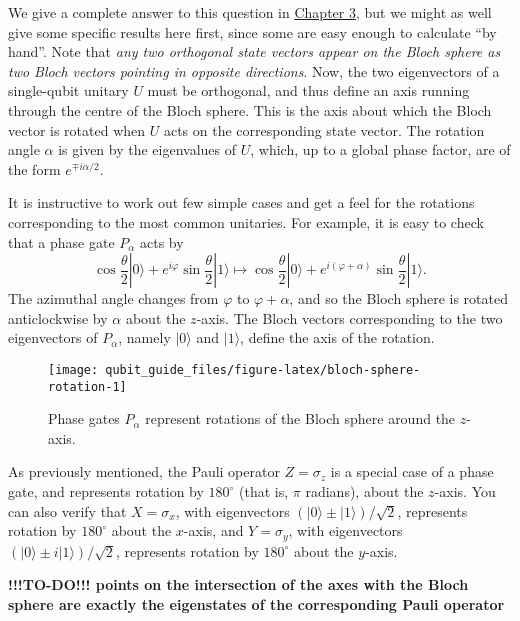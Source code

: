 \documentclass[fleqn]{article}
\begin{document}
We give a complete answer to this question in \protect\hyperlink{quantum-gates}{Chapter 3}, but we might as well give some specific results here first, since some are easy enough to calculate ``by hand''.
Note that \emph{any two orthogonal state vectors appear on the Bloch sphere as two Bloch vectors pointing in opposite directions}.
Now, the two eigenvectors of a single-qubit unitary \(U\) must be orthogonal, and thus define an axis running through the centre of the Bloch sphere.
This is the axis about which the Bloch vector is rotated when \(U\) acts on the corresponding state vector.
The rotation angle \(\alpha\) is given by the eigenvalues of \(U\), which, up to a global phase factor, are of the form \(e^{\mp i\alpha/2}\).

It is instructive to work out few simple cases and get a feel for the rotations corresponding to the most common unitaries.
For example, it is easy to check that a phase gate \(P_\alpha\) acts by
\[
  \cos\frac{\theta}{2}|0\rangle + e^{i\varphi}\sin\frac{\theta}{2}|1\rangle
  \longmapsto
  \cos\frac{\theta}{2}|0\rangle + e^{i(\varphi+\alpha)}\sin\frac{\theta}{2}|1\rangle.
\]
The azimuthal angle changes from \(\varphi\) to \(\varphi+\alpha\), and so the Bloch sphere is rotated anticlockwise by \(\alpha\) about the \(z\)-axis.
The Bloch vectors corresponding to the two eigenvectors of \(P_\alpha\), namely \(|0\rangle\) and \(|1\rangle\), define the axis of the rotation.



\begin{figure}[H]

{\centering \texttt{[image: qubit\_guide\_files/figure-latex/bloch-sphere-rotation-1]} 

}

\caption{Phase gates \(P_\alpha\) represent rotations of the Bloch sphere around the \(z\)-axis.}\label{fig:bloch-sphere-rotation}
\end{figure}

As previously mentioned, the Pauli operator \(Z=\sigma_z\) is a special case of a phase gate, and represents rotation by \({180}^{\circ}\) (that is, \(\pi\) radians), about the \(z\)-axis.
You can also verify that \(X=\sigma_x\), with eigenvectors \({(|0\rangle\pm|1\rangle)/\sqrt{2}}\), represents rotation by \({180}^{\circ}\) about the \(x\)-axis, and \(Y=\sigma_y\), with eigenvectors \({(|0\rangle\pm i|1\rangle)/\sqrt{2}}\), represents rotation by \({180}^{\circ}\) about the \(y\)-axis.

\textbf{!!!TO-DO!!! points on the intersection of the axes with the Bloch sphere are exactly the eigenstates of the corresponding Pauli operator}
\end{document}
